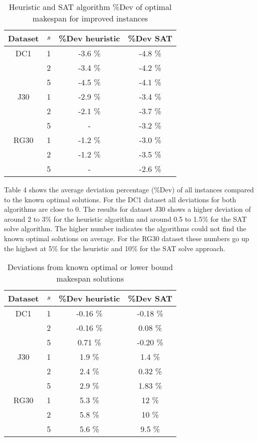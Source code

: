 \begin{table}
	\begin{center}
		\caption{Heuristic and SAT algorithm \%Dev of optimal makespan for improved instances}
		\label{table:table3}
		\begin{tabular}{ c | c c c }
			Dataset & \(s\) & \%Dev heuristic & \%Dev SAT \\
			\hline
			DC1  & 1 & -3.6 \% & -4.8 \% \\ 
			  & 2 & -3.4 \% & -4.2 \% \\  
			  & 5 & -4.5 \% & -4.1 \% \\ 
			J30  & 1 & -2.9 \% & -3.4 \% \\ 
			  & 2 & -2.1 \% & -3.7 \% \\  
			  & 5 & - & -3.2 \% \\ 
			RG30 & 1 & -1.2 \% & -3.0 \% \\ 
			 & 2 & -1.2 \% & -3.5 \% \\  
			 & 5 & - & -2.6 \%
		\end{tabular}
	\end{center}
\end{table}

Table 4 shows the average deviation percentage (\%Dev) of all instances compared to the known optimal solutions. For the DC1 dataset all deviations for both algorithms are close to 0. The results for dataset J30 shows a higher deviation of around 2 to 3\% for the heuristic algorithm and around 0.5 to 1.5\% for the SAT solve algorithm. The higher number indicates the algorithms could not find the known optimal solutions on average. For the RG30 dataset these numbers go up the highest at 5\% for the heuristic and 10\% for the SAT solve approach.

\begin{table}
	\begin{center}
		\caption{Deviations from known optimal or lower bound makespan solutions}
		\label{table:table4}
		\begin{tabular}{ c | c c c }
			Dataset & \(s\) & \%Dev heuristic & \%Dev SAT \\
			\hline
			DC1  & 1 & -0.16 \% & -0.18 \% \\ 
			  & 2 & -0.16 \% & 0.08 \% \\  
			  & 5 & 0.71 \% & -0.20 \% \\ 
			J30  & 1 & 1.9 \% & 1.4 \% \\ 
			  & 2 & 2.4 \% & 0.32 \% \\  
			  & 5 & 2.9 \% & 1.83 \% \\ 
			RG30 & 1 & 5.3 \% & 12 \% \\ 
			 & 2 & 5.8 \% & 10 \% \\  
			 & 5 & 5.6 \% & 9.5 \%
		\end{tabular}
	\end{center}
\end{table}


